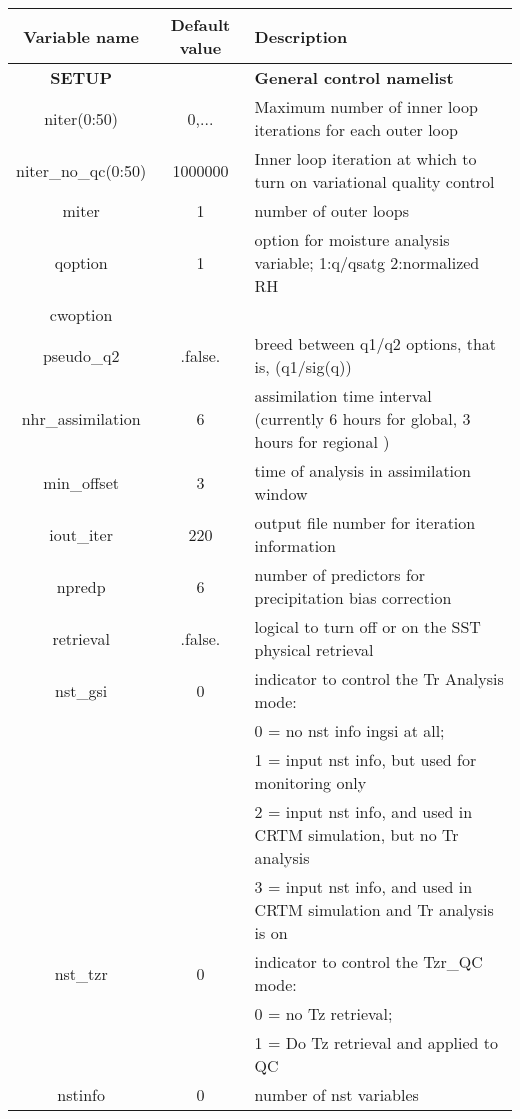   \begin{table}[h]
\footnotesize
 \center
  \begin{tabular}{| c | c | p{9cm} |}
  \hline
  Variable name & Default value & Description \\
  \hline
  \hline
  \textbf{SETUP} &   & \textbf{General control namelist} \\
\hline
    niter(0:50) & 0,... & Maximum number of inner loop iterations for each outer loop \\
  \hline
  niter\_no\_qc(0:50) & 1000000 & Inner loop iteration at which to turn on variational quality control \\
  \hline
  miter & 1 & number of outer loops \\
  \hline
  qoption & 1 & option for moisture analysis variable; 1:q/qsatg 2:normalized RH \\
  \hline
  cwoption & & \\
  \hline
  pseudo\_q2 & .false. & breed between q1/q2 options, that is, (q1/sig(q)) \\
  \hline
  nhr\_assimilation	& 6	& assimilation time interval (currently 6 hours for global, 3 hours for regional ) \\
  \hline
  min\_offset & 3 & time of analysis in assimilation window \\
  \hline 
  iout\_iter & 220 & output file number for iteration information \\
  \hline
  npredp & 6 & number of predictors for precipitation bias correction \\
  \hline
  retrieval & .false. & logical to turn off or on the SST physical retrieval \\
  \hline
  nst\_gsi & 0 & indicator to control the Tr Analysis mode: \\
             & & 0 = no nst info ingsi at all; \\
             & & 1 = input nst info, but used for monitoring only \\
             & & 2 = input nst info, and used in CRTM simulation, but no Tr analysis \\
             & & 3 = input nst info, and used in CRTM simulation and Tr analysis is on \\
  \hline
  nst\_tzr & 0 & indicator to control the Tzr\_QC mode: \\
             & & 0 = no Tz retrieval; \\
             & & 1 = Do Tz retrieval and applied to QC \\
  \hline
  nstinfo & 0 & number of nst variables \\

\end{tabular}
\end{table}
